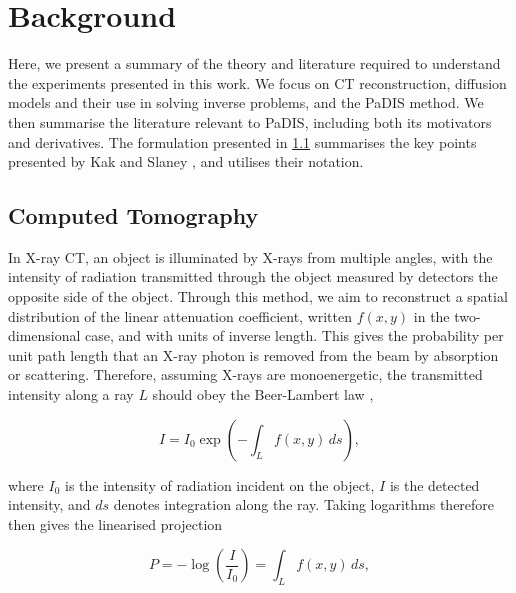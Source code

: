 \ifpdf     \graphicspath{{Sections/2_background_figs/Raster/}{Sections/2_background_figs/PDF/}{Sections/2_background_figs/}}
\else     \graphicspath{{Sections/2_background_figs/Vector/}{Sections/2_background_figs/}}
\fi

\chapter{Background}
\label{ch:background}

Here, we present a summary of the theory and literature required to understand the experiments presented in this work. We focus on CT reconstruction, diffusion models and their use in solving inverse problems, and the PaDIS method. We then summarise the literature relevant to PaDIS, including both its motivators and derivatives. The formulation presented in \ref{sec:basics} summarises the key points presented by Kak and Slaney \cite{Kak_Stanley}, and utilises their notation.

\section{Computed Tomography}
\label{sec:basics}

In X-ray CT, an object is illuminated by X-rays from multiple angles, with the intensity of radiation transmitted through the object measured by detectors the opposite side of the object. Through this method, we aim to reconstruct a spatial distribution of the linear attenuation coefficient, written $f(x,y)$ in the two-dimensional case, and with units of inverse length. This gives the probability per unit path length that an X-ray photon is removed from the beam by absorption or scattering. Therefore, assuming X-rays are monoenergetic, the transmitted intensity along a ray $L$ should obey the Beer-Lambert law \cite{},

\begin{equation}
I=I_0 \exp\left(-\int_L f(x,y) \, ds\right),
\label{eq:beer_lambert}
\end{equation}

where $I_0$ is the intensity of radiation incident on the object, $I$ is the detected intensity, and $ds$ denotes integration along the ray. Taking logarithms therefore then gives the linearised projection

\begin{equation}
P=-\log\left(\frac{I}{I_0}\right)=\int_Lf(x,y)\, ds,
\label{eq:linearised_projection}
\end{equation}


